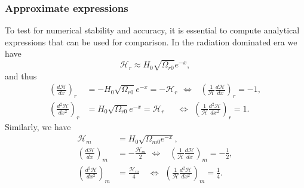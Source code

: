\documentclass{aa}
\begin{document}
\subsubsection{Approximate expressions}
To test for numerical stability and accuracy, it is essential to compute analytical expressions that can be used for comparison. In the radiation dominated era we have
\begin{equation}
  \mathcal{H}_r \approx H_0\sqrt{\Omega_{r0}}e^{-x},
\end{equation}
and thus
\begin{align}
  \left(\frac{d\mathcal{H}}{dx}\right)_r &= -H_0\sqrt{\Omega_{r0}}e^{-x}=-\mathcal{H}_r 
  \hspace{5pt}\Leftrightarrow\hspace{9pt}\left(\frac{1}{\mathcal{H}}\frac{d\mathcal{H}}{dx}\right)_r=-1,
  \\
  \left(\frac{d^2\mathcal{H}}{dx^2}\right)_r &= H_0\sqrt{\Omega_{r0}}e^{-x}=\mathcal{H}_r
  \hspace{18pt}\Leftrightarrow\hspace{5pt}\left(\frac{1}{\mathcal{H}}\frac{d^2\mathcal{H}}{dx^2}\right)_r=1.
\end{align}
Similarly, we have
\begin{align}
  \mathcal{H}_m &= H_0\sqrt{\Omega_{m0}e^{-x}},
  \\
  \left(\frac{d\mathcal{H}}{dx}\right)_m &= -\frac{\mathcal{H}_m}{2} 
  \hspace{5pt}\Leftrightarrow\hspace{10pt}\left(\frac{1}{\mathcal{H}}\frac{d\mathcal{H}}{dx}\right)_m=-\frac{1}{2},
  \\
  \left(\frac{d^2\mathcal{H}}{dx^2}\right)_m &= \frac{\mathcal{H}_m}{4}
  \hspace{12pt}\Leftrightarrow\hspace{5pt}\left(\frac{1}{\mathcal{H}}\frac{d^2\mathcal{H}}{dx^2}\right)_m=\frac{1}{4}.
\end{align}
\end{document}

